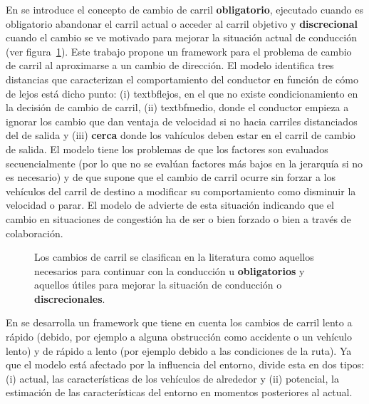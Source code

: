 En \cite{Gipps1986} se introduce el concepto de cambio de carril \textbf{obligatorio}, ejecutado cuando es obligatorio abandonar el carril actual o acceder al carril objetivo y \textbf{discrecional} cuando el cambio se ve motivado para mejorar la situación actual de conducción (ver figura~\ref{fig:lane-change-mandatory-vs-discretional}). Este trabajo propone un framework para el problema de cambio de carril al aproximarse a un cambio de dirección. El modelo identifica tres distancias que caracterizan el comportamiento del conductor en función de cómo de lejos está dicho punto: (i) textbf{lejos}, en el que no existe condicionamiento en la decisión de cambio de carril, (ii) textbf{medio}, donde el conductor empieza a ignorar los cambio que dan ventaja de velocidad si no hacia carriles distanciados del de salida y (iii) \textbf{cerca} donde los vahículos deben estar en el carril de cambio de salida. El modelo tiene los problemas de que los factores son evaluados secuencialmente (por lo que no se evalúan factores más bajos en la jerarquía si no es necesario) y de que supone que el cambio de carril ocurre sin forzar a los vehículos del carril de destino a modificar su comportamiento como disminuir la velocidad o parar. El modelo de \cite{Hidas2002} advierte de esta situación indicando que el cambio en situaciones de congestión ha de ser o bien forzado o bien a través de colaboración.

\begin{figure}
	\caption{Los cambios de carril se clasifican en la literatura como aquellos necesarios para continuar con la conducción u \textbf{obligatorios} y aquellos útiles para mejorar la situación de conducción o \textbf{discrecionales}.}
	\label{fig:lane-change-mandatory-vs-discretional}
\end{figure}

En \cite{wiedemann1992microscopic} se desarrolla un framework que tiene en cuenta los cambios de carril lento a rápido (debido, por ejemplo a alguna obstrucción como accidente o un vehículo lento) y de rápido a lento (por ejemplo debido a las condiciones de la ruta). Ya que el modelo está afectado por la influencia del entorno, divide esta en dos tipos: (i) actual, las características de los vehículos de alrededor y (ii) potencial, la estimación de las características del entorno en momentos posteriores al actual.

